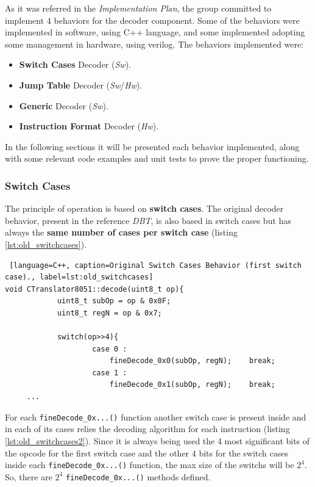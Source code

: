 As it was referred in the \textit{Implementation Plan},  the group committed to implement 4 behaviors for the decoder component. Some of the behaviors were implemented in software, using C++ language, and some implemented adopting some management in hardware, using verilog. The behaviors implemented were:

\begin{itemize}
	\item \textbf{Switch Cases} Decoder (\textit{Sw}).
    \item \textbf{Jump Table} Decoder (\textit{Sw}/\textit{Hw}).
    \item \textbf{Generic} Decoder (\textit{Sw}).
    \item \textbf{Instruction Format} Decoder (\textit{Hw}).
\end{itemize}

In the following sections it will be presented each behavior implemented, along with some relevant code examples and unit tests to prove the proper functioning.


\subsubsection{Switch Cases}
The principle of operation is based on \textbf{switch cases}.
The original decoder behavior, present in the reference \textit{DBT}, is also based in switch cases but has always the \textbf{same number of cases per switch case} (listing \ref{lst:old_switchcases}).

\begin{lstlisting} [language=C++, caption=Original Switch Cases Behavior (first switch case)., label=lst:old_switchcases]
void CTranslator8051::decode(uint8_t op){
			uint8_t subOp = op & 0x0F;
			uint8_t regN = op & 0x7;	

			switch(op>>4){
					case 0 :
						fineDecode_0x0(subOp, regN);	break;
					case 1 :
						fineDecode_0x1(subOp, regN);	break; 
     ...   
\end{lstlisting}

For each \texttt{fineDecode\_0x...()} function another switch case is present inside and in each of its cases relies the decoding algorithm for each instruction (listing \ref{lst:old_switchcases2}). Since it is always being used the 4 most significant bits of the opcode for the first switch case and the other 4 bits for the switch cases inside each \texttt{fineDecode\_0x...()} function, the max size of the switchs will be $2^{4}$. So, there are $2^{4}$ \texttt{fineDecode\_0x...()} methods defined.

